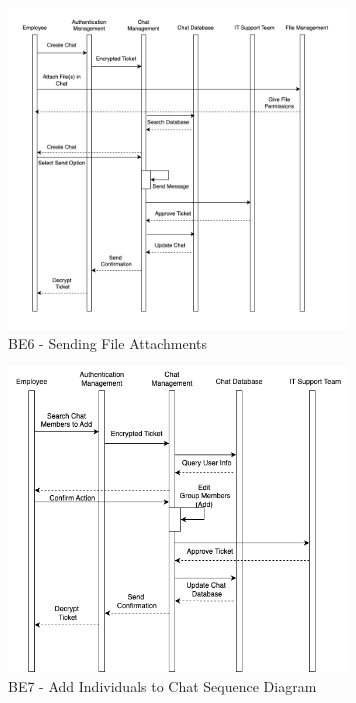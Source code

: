 \documentclass[]{article}
\begin{document}
\begin{figure}[H]
	\centering
	\includegraphics[width=9cm]{BE6.png}
	\caption{BE6 - Sending File Attachments}
	\label{fig:galaxy}
\end{figure}

\begin{figure}[H]
	\centering
	\includegraphics[width=0.8\textwidth]{BE7.png}
	\caption{BE7 - Add Individuals to Chat Sequence Diagram}
\end{figure}
\end{document}
